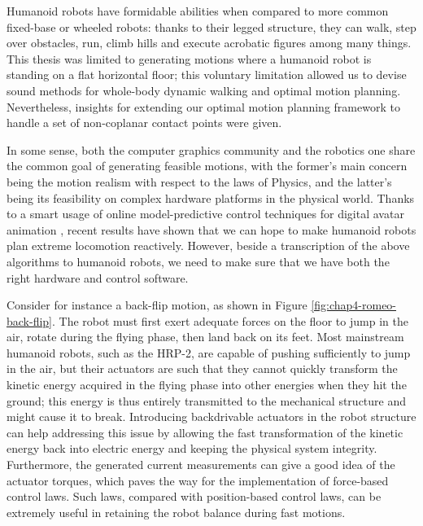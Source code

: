 Humanoid robots have formidable abilities when compared to more common
fixed-base or wheeled robots: thanks to their legged structure, they
can walk, step over obstacles, run, climb hills and execute acrobatic
figures among many things. This thesis was limited to generating
motions where a humanoid robot is standing on a flat horizontal floor;
this voluntary limitation allowed us to devise sound methods for
whole-body dynamic walking and optimal motion planning. Nevertheless,
insights for extending our optimal motion planning framework to handle
a set of non-coplanar contact points were given.

\bigskip

In some sense, both the computer graphics community and the robotics
one share the common goal of generating feasible motions, with the
former's main concern being the motion realism with respect to the
laws of Physics, and the latter's being its feasibility on complex
hardware platforms in the physical world. Thanks to a smart usage of
online model-predictive control techniques for digital avatar
animation \cite{coros2010generalized,tassa2012synthesis}, recent
results have shown that we can hope to make humanoid robots plan
extreme locomotion reactively. However, beside a transcription of the
above algorithms to humanoid robots, we need to make sure that we have
both the right hardware and control software.

Consider for instance a back-flip motion, as shown in Figure
\ref{fig:chap4-romeo-back-flip}. The robot must first exert adequate
forces on the floor to jump in the air, rotate during the flying
phase, then land back on its feet. Most mainstream humanoid robots,
such as the HRP-2, are capable of pushing sufficiently to jump in the
air, but their actuators are such that they cannot quickly transform
the kinetic energy acquired in the flying phase into other energies
when they hit the ground; this energy is thus entirely transmitted to
the mechanical structure and might cause it to break. Introducing
backdrivable actuators in the robot structure can help addressing this
issue by allowing the fast transformation of the kinetic energy back
into electric energy and keeping the physical system
integrity. Furthermore, the generated current measurements can give a
good idea of the actuator torques, which paves the way for the
implementation of force-based control laws. Such laws, compared with
position-based control laws, can be extremely useful in retaining the
robot balance during fast motions.

\bigskip

